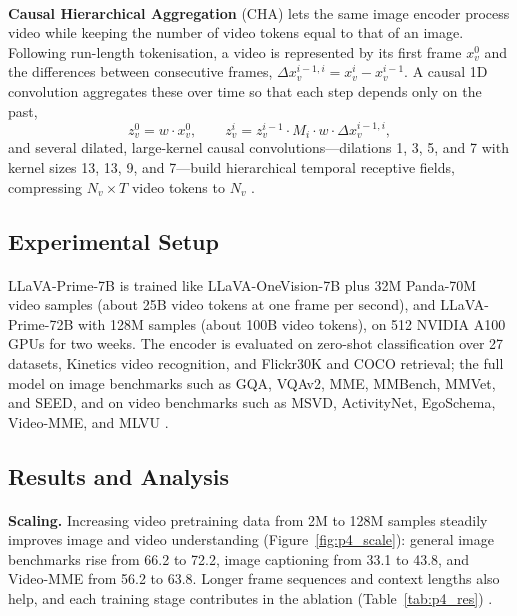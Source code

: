 \documentclass[12pt,a4paper,final]{extreport}
\begin{document}
\paragraph{} \textbf{Causal Hierarchical Aggregation} (CHA) lets the same image encoder process video while keeping the number of video tokens equal to that of an image. Following run-length tokenisation, a video is represented by its first frame $x_v^0$ and the differences between consecutive frames, $\Delta x_v^{i-1,i}=x_v^{i}-x_v^{i-1}$. A causal 1D convolution aggregates these over time so that each step depends only on the past,
\begin{equation}
z_v^0=w\cdot x_v^0,\qquad z_v^i=z_v^{i-1}\cdot M_i\cdot w\cdot\Delta x_v^{i-1,i},
\end{equation}
and several dilated, large-kernel causal convolutions---dilations 1, 3, 5, and 7 with kernel sizes 13, 13, 9, and 7---build hierarchical temporal receptive fields, compressing $N_v\times T$ video tokens to $N_v$ \cite{p4}.

\subsection{Experimental Setup}

\paragraph{} LLaVA-Prime-7B is trained like LLaVA-OneVision-7B plus 32M Panda-70M video samples (about 25B video tokens at one frame per second), and LLaVA-Prime-72B with 128M samples (about 100B video tokens), on 512 NVIDIA A100 GPUs for two weeks. The encoder is evaluated on zero-shot classification over 27 datasets, Kinetics video recognition, and Flickr30K and COCO retrieval; the full model on image benchmarks such as GQA, VQAv2, MME, MMBench, MMVet, and SEED, and on video benchmarks such as MSVD, ActivityNet, EgoSchema, Video-MME, and MLVU \cite{p4}.

\subsection{Results and Analysis}

\paragraph{} \textbf{Scaling.} Increasing video pretraining data from 2M to 128M samples steadily improves image and video understanding (Figure~\ref{fig:p4_scale}): general image benchmarks rise from 66.2 to 72.2, image captioning from 33.1 to 43.8, and Video-MME from 56.2 to 63.8. Longer frame sequences and context lengths also help, and each training stage contributes in the ablation (Table~\ref{tab:p4_res}) \cite{p4}.
\end{document}
